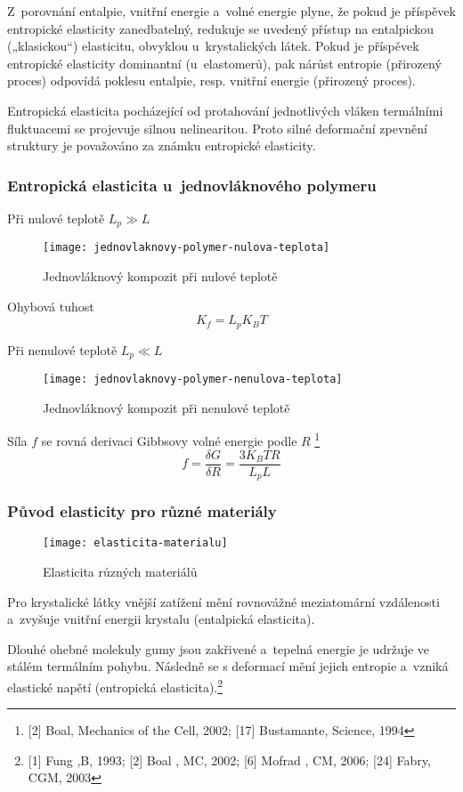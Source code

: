 Z~porovnání entalpie, vnitřní energie a~volné energie plyne, že pokud je příspěvek entropické elasticity zanedbatelný, redukuje se uvedený přístup na entalpickou („klasickou“) elasticitu, obvyklou u~krystalických látek.
Pokud je příspěvek entropické elasticity dominantní (u~elastomerů), pak nárůst entropie (přirozený proces) odpovídá poklesu entalpie, resp. vnitřní energie (přirozený proces).

Entropická elasticita pocházející od protahování jednotlivých vláken termálními fluktuacemi se projevuje silnou nelinearitou.
Proto silné deformační zpevnění struktury je považováno za známku entropické elasticity.

\subsubsection{Entropická elasticita u~jednovláknového polymeru}
Při nulové teplotě $L_p \gg L$
\begin{figure}[H]
	\centering
	\texttt{[image: jednovlaknovy-polymer-nulova-teplota]}
	\caption{Jednovláknový kompozit při nulové teplotě}
	\label{fig:jednovlaknovy-polymer-nulova-teplota}
\end{figure}
Ohybová tuhost
\begin{equation}
	K_f = L_p K_B T
\end{equation}

Při nenulové teplotě $L_p \ll L$
\begin{figure}[H]
	\centering
	\texttt{[image: jednovlaknovy-polymer-nenulova-teplota]}
	\caption{Jednovláknový kompozit při nenulové teplotě}
	\label{fig:jednovlaknovy-polymer-nenulova-teplota}
\end{figure}

Síla $f$ se rovná derivaci Gibbsovy volné energie podle $R$
\footnote{[2] Boal, Mechanics of the Cell, 2002; [17] Bustamante, Science, 1994}
\begin{equation}
	f = \frac{\delta G}{\delta R} = \frac{3 K_B T R}{L_p L}
\end{equation}

\subsubsection{Původ elasticity pro různé materiály}
\begin{figure}[H]
	\centering
	\texttt{[image: elasticita-materialu]}
	\caption{Elasticita různých materiálů}
	\label{fig:elasticita-materialu}
\end{figure}

Pro krystalické látky vnější zatížení mění rovnovážné meziatomární vzdálenosti a~zvyšuje vnitřní energii krystalu (entalpická elasticita).

Dlouhé ohebné molekuly gumy jsou zakřivené a~tepelná energie je udržuje ve stálém termálním pohybu.
Následně se s deformací mění jejich entropie a~vzniká elastické napětí (entropická elasticita).\footnote{[1] Fung ,B, 1993; [2] Boal , MC, 2002; [6] Mofrad , CM, 2006; [24] Fabry, CGM, 2003}
